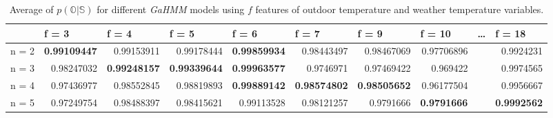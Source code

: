 \begin{table}[htbp]
  \centering
  \scriptsize
  \caption{Average of $p(\mathbb{O}|\mathbb{S})$ for different \textit{GaHMM} models using $f$ features of outdoor temperature and weather temperature variables. }
      \begin{tabular}{|l|r|r|r|r|r|r|r|r|r|}
    \hline
         & \multicolumn{1}{l|}{f = 3} & \multicolumn{1}{l|}{f = 4} & \multicolumn{1}{l|}{f = 5} & \multicolumn{1}{l|}{f = 6} & \multicolumn{1}{l|}{f = 7} & \multicolumn{1}{l|}{f = 9} & \multicolumn{1}{l|}{f = 10} & \multicolumn{1}{l|}{…} & \multicolumn{1}{l|}{f = 18} \bigstrut\\
    \hline
    n = 2 & \cellcolor[rgb]{ .773,  .851,  .945} \textbf{0.99109447} & 0.99153911 & 0.99178444 & \cellcolor[rgb]{ 1,  .753,  0} \textbf{0.99859934} & 0.98443497 & 0.98467069 & 0.97706896 &      & 0.9924231 \bigstrut\\
    \hline
    n = 3 & 0.98247032 & \cellcolor[rgb]{ .773,  .851,  .945} \textbf{0.99248157} & \cellcolor[rgb]{ .773,  .851,  .945} \textbf{0.99339644} & \cellcolor[rgb]{ 1,  .753,  0} \textbf{0.99963577} & 0.9746971 & 0.97469422 & 0.969422 &      & 0.9974565 \bigstrut\\
    \hline
    n = 4 & 0.97436977 & 0.98552845 & 0.98819893 & \cellcolor[rgb]{ 1,  .753,  0} \textbf{0.99889142} & \cellcolor[rgb]{ .773,  .851,  .945} \textbf{0.98574802} & \cellcolor[rgb]{ .773,  .851,  .945} \textbf{0.98505652} & 0.96177504 &      & 0.9956667 \bigstrut\\
    \hline
    n = 5 & 0.97249754 & 0.98488397 & 0.98415621 & 0.99113528 & 0.98121257 & 0.9791666 & \cellcolor[rgb]{ .773,  .851,  .945} \textbf{0.9791666} &      & \cellcolor[rgb]{ .773,  .851,  .945} \textbf{0.9992562} \bigstrut\\
    \hline
    \end{tabular}%
  \label{tab:result_training_seasonal}%
\end{table}%

